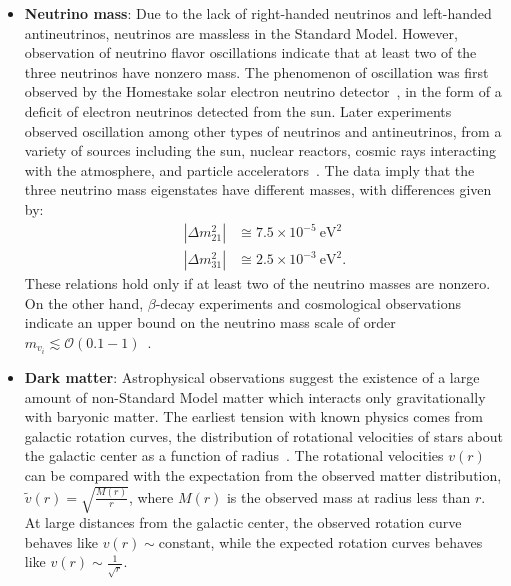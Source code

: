 \begin{itemize}
	\item \textbf{Neutrino mass}: Due to the lack of right-handed neutrinos and left-handed antineutrinos, neutrinos are massless in the Standard Model. However, observation of neutrino flavor oscillations indicate that at least two of the three neutrinos have nonzero mass. The phenomenon of oscillation was first observed by the Homestake solar electron neutrino detector~\cite{Cleveland:1998nv}, in the form of a deficit of electron neutrinos detected from the sun. Later experiments observed oscillation among other types of neutrinos and antineutrinos, from a variety of sources including the sun, nuclear reactors, cosmic rays interacting with the atmosphere, and particle accelerators~\cite{pdg}. The data imply that the three neutrino mass eigenstates have different masses, with differences given by:
	\begin{align}\label{eqn:neutrino-mass-differences}
		|\Delta m_{21}^2| &\cong 7.5\times 10^{-5}~\mbox{eV}^2 \\
		|\Delta m_{31}^2| &\cong 2.5\times 10^{-3}~\mbox{eV}^2.
	\end{align}
	These relations hold only if at least two of the neutrino masses are nonzero. On the other hand, $\beta$-decay experiments and cosmological observations indicate an upper bound on the neutrino mass scale of order $m_{v_i} \lesssim \mathcal{O}(0.1-1)$~\cite{Aseev:2011ia, Abazajian:2011ck, Ade:2013zuv}.

	\item \textbf{Dark matter}: Astrophysical observations suggest the existence of a large amount of non-Standard Model matter which interacts only gravitationally with baryonic matter. The earliest tension with known physics comes from galactic rotation curves, the distribution of rotational velocities of stars about the galactic center as a function of radius~\cite{1980ApJ_238_471R}. The rotational velocities $v(r)$ can be compared with the expectation from the observed matter distribution, $\tilde{v}(r)=\sqrt{\frac{M(r)}{r}}$, where $M(r)$ is the observed mass at radius less than $r$. At large distances from the galactic center, the observed rotation curve behaves like $v(r)\sim$constant, while the expected rotation curves behaves like $v(r)\sim \frac{1}{\sqrt{r}}$. 


\end{itemize}
